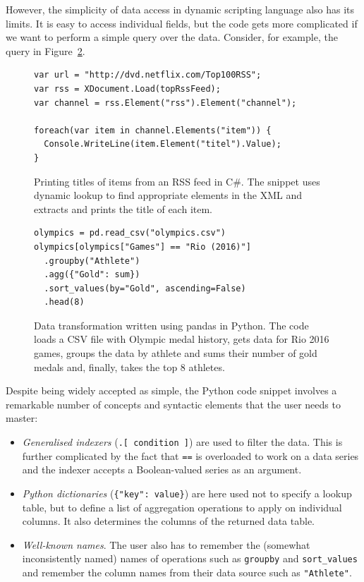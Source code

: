\documentclass[fleqn,11pt]{report}
\theoremstyle{definition}
\newenvironment{nitemize}
{ \vspace{-0.4em}
  \begin{itemize}
    \setlength{\itemsep}{5pt}
    \setlength{\parskip}{0pt}
    \setlength{\parsep}{0pt} }
{ \end{itemize}
  \vspace{-0.4em} }
\begin{document}
However, the simplicity of data access in dynamic scripting language also has its limits. It is easy to
access individual fields, but the code gets more complicated if we want to perform a simple
query over the data. Consider, for example, the query in Figure~\ref{fig:pandas}.

\begin{figure}[h!]
\vspace{-0.33em}
\begin{lstlisting}[language=sharp]
var url = "http://dvd.netflix.com/Top100RSS";
var rss = XDocument.Load(topRssFeed);
var channel = rss.Element("rss").Element("channel");

foreach(var item in channel.Elements("item")) {
  Console.WriteLine(item.Element("titel").Value);
}
\end{lstlisting}
\vspace{-0.33em}
\caption{Printing titles of items from an RSS feed in C\#. The snippet uses dynamic lookup to
find appropriate elements in the XML and extracts and prints the title of each item.}
\label{fig:rss}
\end{figure}

\begin{figure}[t]
\begin{lstlisting}[language=ppython]
olympics = pd.read_csv("olympics.csv")
olympics[olympics["Games"] == "Rio (2016)"]
  .groupby("Athlete")
  .agg({"Gold": sum})
  .sort_values(by="Gold", ascending=False)
  .head(8)
\end{lstlisting}
\caption{Data transformation written using pandas in Python. The code loads a CSV file with
Olympic medal history, gets data for Rio 2016 games, groups the data by athlete and sums their
number of gold medals and, finally, takes the top 8 athletes.}
\label{fig:pandas}
\end{figure}

Despite being widely accepted as simple, the Python code snippet involves a remarkable number
of concepts and syntactic elements that the user needs to master:

\begin{nitemize}
\item \emph{Generalised indexers} (\texttt{.[ condition ]}) are used to filter the data. This is
  further complicated by the fact that \texttt{==} is overloaded to work on a data series and the
  indexer accepts a Boolean-valued series as an argument.
\item \emph{Python dictionaries} (\texttt{\{"key": value\}}) are here used not to specify a lookup
  table, but to define a list of aggregation operations to apply on individual columns. It also
  determines the columns of the returned data table.
\item \emph{Well-known names}. The user also has to remember the (somewhat inconsistently named)
  names of operations such as \texttt{groupby} and \texttt{sort\_values} and remember the
  column names from their data source such as \texttt{"Athlete"}.
\end{nitemize}
\end{document}
